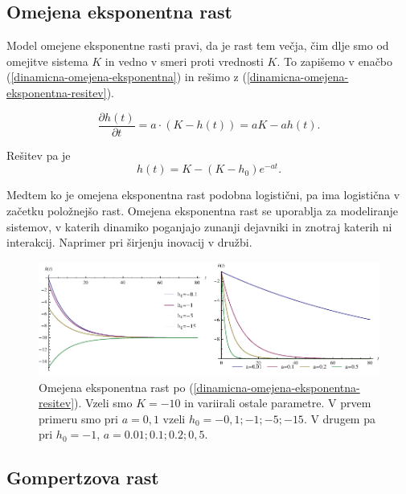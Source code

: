 \documentclass[a4paper, twoside, 12pt]{book}
\begin{document}
    \subsection{Omejena eksponentna rast}

    Model omejene eksponentne rasti pravi, da je rast tem večja, čim dlje smo od omejitve sistema $K$ in vedno v smeri proti vrednosti $K$. To zapišemo v enačbo (\ref{dinamicna-omejena-eksponentna}) in rešimo z (\ref{dinamicna-omejena-eksponentna-resitev}).

    \begin{equation}
      \frac{\partial h(t)}{\partial t} = a \cdot ( K - h(t) ) = a K - a h(t).
      \label{dinamicna-omejena-eksponentna}
    \end{equation}

    Rešitev pa je
    \begin{equation}
      h(t) = K - (K - h_0) e^{-a t}.
      \label{dinamicna-omejena-eksponentna-resitev}
    \end{equation}

    Medtem ko je omejena eksponentna rast podobna logistični, pa ima logistična v začetku položnejšo rast. Omejena eksponentna rast se uporablja za modeliranje sistemov, v katerih dinamiko poganjajo zunanji dejavniki in znotraj katerih ni interakcij. Naprimer pri širjenju inovacij v družbi.

    \begin{figure}[h]
      \begin{center}
        \includegraphics[width=14cm]{slike/omejena-eksponentna-rast}
      \end{center}
      \caption{Omejena eksponentna rast po (\ref{dinamicna-omejena-eksponentna-resitev}). Vzeli smo $K=-10$ in variirali ostale parametre. V prvem primeru smo pri $a=0,1$ vzeli $h_0=-0,1;-1;-5;-15$. V drugem pa pri $h_0=-1$, $a=0.01;0.1;0.2;0,5$.}
      \label{fig:omejena-eksponentna-rast}
    \end{figure}



    \subsection{Gompertzova rast}
\end{document}
